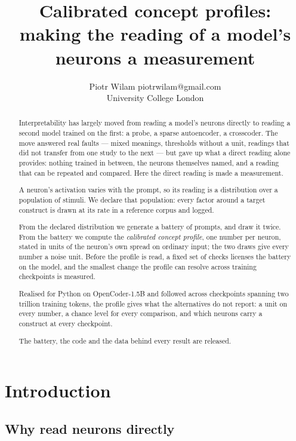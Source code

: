 \documentclass{article}
\title{Calibrated concept profiles: \\ making the reading of a model's neurons a measurement}
\author{\name Piotr Wilam \email piotrwilam@gmail.com \\
        \addr University College London}
\date{}
\begin{document}
\maketitle
\begin{abstract}
Interpretability has largely moved from reading a model's neurons directly to reading a second model trained on the first: a probe, a sparse autoencoder, a crosscoder. The move answered real faults --- mixed meanings, thresholds without a unit, readings that did not transfer from one study to the next --- but gave up what a direct reading alone provides: nothing trained in between, the neurons themselves named, and a reading that can be repeated and compared. Here the direct reading is made a measurement.

A neuron's activation varies with the prompt, so its reading is a distribution over a population of stimuli. We declare that population: every factor around a target construct is drawn at its rate in a reference corpus and logged.

From the declared distribution we generate a battery of prompts, and draw it twice. From the battery we compute the \emph{calibrated concept profile}, one number per neuron, stated in units of the neuron's own spread on ordinary input; the two draws give every number a noise unit. Before the profile is read, a fixed set of checks licenses the battery on the model, and the smallest change the profile can resolve across training checkpoints is measured.

Realised for Python on OpenCoder-1.5B and followed across checkpoints spanning two trillion training tokens, the profile gives what the alternatives do not report: a unit on every number, a chance level for every comparison, and which neurons carry a construct at every checkpoint.

The battery, the code and the data behind every result are released.
\end{abstract}


\section{Introduction}

\subsection{Why read neurons directly}
\end{document}
